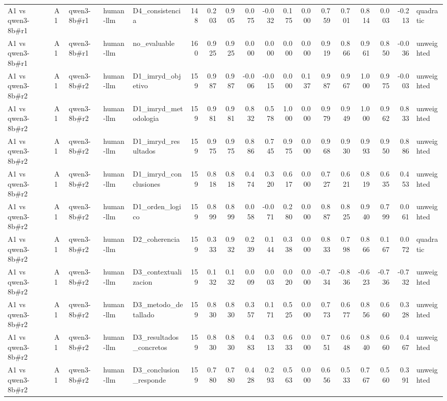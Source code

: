 \begin{table}
{\begin{tabular}{lllllrrrrrrrrrrrrl}
A1 vs qwen3-8b\#r1 & A1 & qwen3-8b\#r1 & human-llm & D4\_consistencia & 148 & 0.203 & 0.905 & 0.075 & -0.032 & 0.175 & 0.000 & 0.759 & 0.701 & 0.814 & 0.003 & -0.213 & quadratic \\
A1 vs qwen3-8b\#r1 & A1 & qwen3-8b\#r1 & human-llm & no\_evaluable & 160 & 0.925 & 0.925 & 0.000 & 0.000 & 0.000 & 0.000 & 0.919 & 0.866 & 0.961 & 0.850 & -0.036 & unweighted \\
A1 vs qwen3-8b\#r2 & A1 & qwen3-8b\#r2 & human-llm & D1\_imryd\_objetivo & 159 & 0.987 & 0.987 & -0.006 & -0.015 & 0.000 & 0.137 & 0.987 & 0.967 & 1.000 & 0.975 & -0.003 & unweighted \\
A1 vs qwen3-8b\#r2 & A1 & qwen3-8b\#r2 & human-llm & D1\_imryd\_metodologia & 159 & 0.981 & 0.981 & 0.832 & 0.578 & 1.000 & 0.000 & 0.979 & 0.949 & 1.000 & 0.962 & 0.833 & unweighted \\
A1 vs qwen3-8b\#r2 & A1 & qwen3-8b\#r2 & human-llm & D1\_imryd\_resultados & 159 & 0.975 & 0.975 & 0.886 & 0.745 & 0.975 & 0.000 & 0.968 & 0.930 & 0.993 & 0.950 & 0.886 & unweighted \\
A1 vs qwen3-8b\#r2 & A1 & qwen3-8b\#r2 & human-llm & D1\_imryd\_conclusiones & 159 & 0.818 & 0.818 & 0.474 & 0.320 & 0.617 & 0.000 & 0.727 & 0.621 & 0.819 & 0.635 & 0.453 & unweighted \\
A1 vs qwen3-8b\#r2 & A1 & qwen3-8b\#r2 & human-llm & D1\_orden\_logico & 159 & 0.899 & 0.899 & 0.058 & -0.071 & 0.280 & 0.000 & 0.887 & 0.825 & 0.940 & 0.799 & 0.061 & unweighted \\
A1 vs qwen3-8b\#r2 & A1 & qwen3-8b\#r2 & human-llm & D2\_coherencia & 159 & 0.333 & 0.932 & 0.239 & 0.144 & 0.338 & 0.000 & 0.833 & 0.798 & 0.866 & 0.167 & 0.072 & quadratic \\
A1 vs qwen3-8b\#r2 & A1 & qwen3-8b\#r2 & human-llm & D3\_contextualizacion & 159 & 0.132 & 0.132 & 0.009 & 0.003 & 0.020 & 0.000 & -0.734 & -0.836 & -0.623 & -0.736 & -0.732 & unweighted \\
A1 vs qwen3-8b\#r2 & A1 & qwen3-8b\#r2 & human-llm & D3\_metodo\_detallado & 159 & 0.830 & 0.830 & 0.357 & 0.171 & 0.525 & 0.000 & 0.773 & 0.677 & 0.856 & 0.660 & 0.328 & unweighted \\
A1 vs qwen3-8b\#r2 & A1 & qwen3-8b\#r2 & human-llm & D3\_resultados\_concretos & 159 & 0.830 & 0.830 & 0.483 & 0.313 & 0.633 & 0.000 & 0.751 & 0.648 & 0.840 & 0.660 & 0.467 & unweighted \\
A1 vs qwen3-8b\#r2 & A1 & qwen3-8b\#r2 & human-llm & D3\_conclusion\_responde & 159 & 0.780 & 0.780 & 0.428 & 0.293 & 0.563 & 0.000 & 0.656 & 0.533 & 0.767 & 0.560 & 0.391 & unweighted \\

\end{tabular}}
\end{table}
